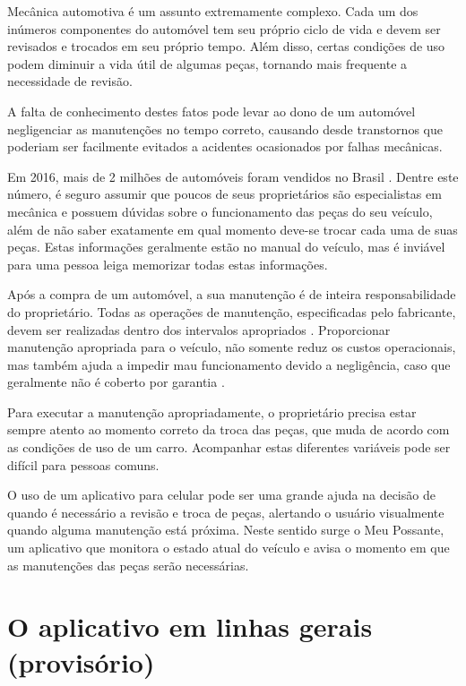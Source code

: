 \label{meupossante}
Mecânica automotiva é um assunto extremamente complexo. Cada um dos inúmeros componentes
do automóvel tem seu próprio ciclo de vida e devem ser revisados e trocados em seu próprio
tempo. Além disso, certas condições de uso podem diminuir a vida útil de algumas peças,
tornando mais frequente a necessidade de revisão.

A falta de conhecimento destes fatos pode levar ao dono de um automóvel negligenciar
as manutenções no tempo correto, causando desde transtornos que poderiam ser facilmente
evitados a acidentes ocasionados por falhas mecânicas.

Em 2016, mais de 2 milhões de automóveis foram vendidos no Brasil
\cite{fenabrave}. Dentre este número, é seguro assumir que poucos de seus
proprietários são especialistas em mecânica e possuem dúvidas sobre o
funcionamento das peças do seu veículo, além de não saber exatamente em qual
momento deve-se trocar cada uma de suas peças. Estas informações geralmente
estão no manual do veículo, mas é inviável para uma pessoa leiga memorizar
todas estas informações.

Após a compra de um automóvel, a sua manutenção é de inteira responsabilidade
do proprietário. Todas as operações de manutenção, especificadas pelo fabricante,
devem ser realizadas dentro dos intervalos apropriados \cite{manualhyundai}.
Proporcionar manutenção apropriada para o veículo, não somente reduz os custos
operacionais, mas também ajuda a impedir mau funcionamento devido a negligência,
caso que geralmente não é coberto por garantia \cite{manualonix}.

Para executar a manutenção apropriadamente, o proprietário precisa estar
sempre atento ao momento correto da troca das peças, que muda de acordo
com as condições de uso de um carro. Acompanhar estas diferentes variáveis pode
ser difícil para pessoas comuns.

O uso de um aplicativo para celular pode ser uma grande ajuda na decisão de quando
é necessário a revisão e troca de peças, alertando o usuário visualmente quando alguma
manutenção está próxima. Neste sentido surge o Meu Possante, um aplicativo que monitora
o estado atual do veículo e avisa o momento em que as manutenções das peças serão
necessárias.

\section{O aplicativo em linhas gerais (provisório)}
\label{meupossante-app}

